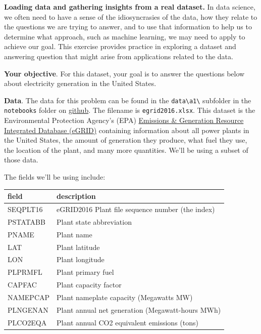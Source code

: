 \documentclass[
  letterpaper,
  DIV=11,
  numbers=noendperiod]{scrartcl}
\begin{document}
\textbf{Loading data and gathering insights from a real dataset.} In
data science, we often need to have a sense of the idiosyncrasies of the
data, how they relate to the questions we are trying to answer, and to
use that information to help us to determine what approach, such as
machine learning, we may need to apply to achieve our goal. This
exercise provides practice in exploring a dataset and answering question
that might arise from applications related to the data.

\textbf{Your objective}. For this dataset, your goal is to answer the
questions below about electricity generation in the United States.

\textbf{Data}. The data for this problem can be found in the
\texttt{data\textbackslash{}a1\textbackslash{}} subfolder in the
\texttt{notebooks} folder on
\href{https://github.com/kylebradbury/ids705}{github}. The filename is
\texttt{egrid2016.xlsx}. This dataset is the Environmental Protection
Agency's (EPA)
\href{https://www.epa.gov/energy/emissions-generation-resource-integrated-database-egrid}{Emissions
\& Generation Resource Integrated Database (eGRID)} containing
information about all power plants in the United States, the amount of
generation they produce, what fuel they use, the location of the plant,
and many more quantities. We'll be using a subset of those data.

The fields we'll be using include:

\begin{longtable}[]{@{}ll@{}}
\toprule\noalign{}
field & description \\
\midrule\noalign{}
\endhead
\bottomrule\noalign{}
\endlastfoot
SEQPLT16 & eGRID2016 Plant file sequence number (the index) \\
PSTATABB & Plant state abbreviation \\
PNAME & Plant name \\
LAT & Plant latitude \\
LON & Plant longitude \\
PLPRMFL & Plant primary fuel \\
CAPFAC & Plant capacity factor \\
NAMEPCAP & Plant nameplate capacity (Megawatts MW) \\
PLNGENAN & Plant annual net generation (Megawatt-hours MWh) \\
PLCO2EQA & Plant annual CO2 equivalent emissions (tons) \\
\end{longtable}
\end{document}
